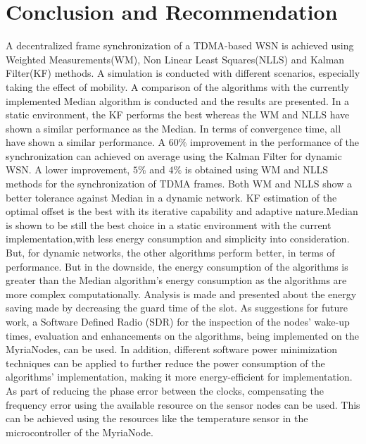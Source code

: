 \documentclass[journal]{IEEEtran}
\begin{document}
\section{\textbf{Conclusion and Recommendation}}
\noindent A decentralized frame synchronization of a TDMA-based WSN is achieved
using Weighted Measurements(WM), Non Linear Least Squares(NLLS) and
Kalman Filter(KF) methods. A simulation is conducted with different scenarios, especially
taking the effect of mobility. A comparison of the algorithms with the currently implemented Median algorithm
is conducted and the results are presented.
\newline
In a static environment, the KF performs the best whereas the WM and NLLS have shown a similar performance as the
Median. In terms of convergence time, all have shown a similar performance.
\newline
A $60\%$ improvement in the performance of the synchronization can
achieved on average using the Kalman Filter for dynamic WSN. A lower
improvement, $5\%$ and $4\%$ is obtained using WM and NLLS methods
for the synchronization of TDMA frames. Both WM and NLLS show a better tolerance
against Median in a dynamic network. KF estimation of
the optimal offset is the best with its iterative capability and
adaptive nature.\newline Median is shown to be still the best choice in a static environment with the current implementation,with less energy consumption and simplicity into consideration. But, for dynamic networks, the other algorithms perform better, in terms of
performance.
\newline But in the downside, the energy consumption of the algorithms is
greater than the Median algorithm's energy consumption as the algorithms are more complex computationally. Analysis is made and presented about the energy saving made by decreasing the guard time of the slot.
\newline  As suggestions for future work, a Software Defined Radio (SDR) for the inspection of the nodes' wake-up times, evaluation and enhancements on the algorithms, being implemented on the MyriaNodes, can be used. In addition, different software power minimization techniques can be applied to further reduce the power consumption of the algorithms' implementation, making it more energy-efficient for implementation.  As part of reducing the phase error between the clocks, compensating the frequency error using the available resource on the sensor nodes can be used. This can be achieved using the resources like the temperature sensor in the
microcontroller of the MyriaNode.
\end{document}
